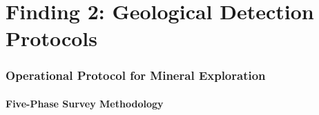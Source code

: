 \documentclass[11pt]{article}
\theoremstyle{definition}
\theoremstyle{remark}
\begin{document}
\part{Finding 2: Geological Detection Protocols}
\label{part:geological}

\section{Operational Protocol for Mineral Exploration}
\label{sec:geo-protocol}

\subsection{Five-Phase Survey Methodology}
\end{document}
